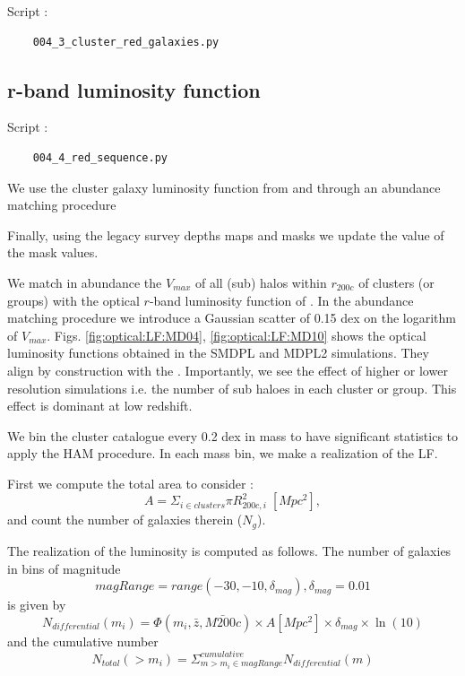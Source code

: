 \documentclass[fleqn,usenatbib,onecolumn]{mnras}
\begin{document}
Script :
\begin{verbatim}
    004_3_cluster_red_galaxies.py
\end{verbatim}


\subsection{r-band luminosity function}

Script :
\begin{verbatim}
    004_4_red_sequence.py
\end{verbatim}


We use the cluster galaxy luminosity function from \citet{2018AA...620A..13R} and through an abundance matching procedure 

Finally, using the legacy survey depths maps and masks we update the value of the mask values.

We match in abundance the $V_{max}$ of all (sub) halos within $r_{200c}$ of clusters (or groups) with the optical $r$-band luminosity function of \citet[][Tables 3,5, Eq. 8,9,10]{2018AA...620A..13R}. 
In the abundance matching procedure we introduce a Gaussian scatter of 0.15 dex on the logarithm of $V_{max}$. 
Figs. \ref{fig:optical:LF:MD04}, \ref{fig:optical:LF:MD10} shows the optical luminosity functions obtained in the SMDPL and MDPL2 simulations. 
They align by construction with the \citep{2018AA...620A..13R}. 
Importantly, we see the effect of higher or lower resolution simulations i.e. the number of sub haloes in each cluster or group. 
This effect is dominant at low redshift. 

We bin the cluster catalogue every 0.2 dex in mass to have significant statistics to apply the HAM procedure. 
In each mass bin, we make a realization of the LF.

First we compute the total area to consider :
\begin{equation}
    A = \Sigma_{i \in clusters} \pi  R^2_{200c,i} \; [Mpc^2] ,
\end{equation}
and count the number of galaxies therein ($N_g$). 

The realization of the luminosity is computed as follows. 
The number of galaxies in bins of magnitude 
\begin{equation}
magRange = range(-30, -10, \delta_{mag}), \delta_{mag} = 0.01
\end{equation}
is given by 
\begin{equation}
N_{differential}(m_i) = \Phi(m_i, \bar{z}, \bar{M200c}) \times  A [Mpc^2] \times \delta_{mag} \times \ln(10)
\end{equation}
and the cumulative number  
\begin{equation}
N_{total}(>m_i) = \Sigma^{cumulative}_{m>m_i \in magRange} N_{differential}(m)
\end{equation}
\end{document}
